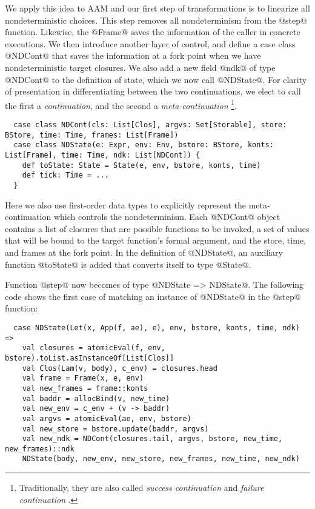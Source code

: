 \documentclass[acmsmall, review]{acmart}\settopmatter{}
\begin{document}
We apply this idea to AAM and our first step of transformations is to linearize all
nondeterministic choices. This step removes all nondeterminism from the @step@ function.
Likewise, the @Frame@ saves the information of the caller in concrete executions.
We then introduce another layer of control, and define a case class @NDCont@
that saves the information at a fork point when we have nondeterministic target closures.
We also add a new field @ndk@ of type @NDCont@ to the definition of state, which we now 
call @NDState@. For clarity of presentation in differentiating between the two continuations, 
we elect to call the first a \emph{continuation}, and the second a \emph{meta-continuation}
\footnote{Traditionally, they are also called \emph{success continuation} and \emph{failure
continuation} \cite{Danvy:1990:AC:91556.91622}.}.

\begin{lstlisting}
  case class NDCont(cls: List[Clos], argvs: Set[Storable], store: BStore, time: Time, frames: List[Frame])
  case class NDState(e: Expr, env: Env, bstore: BStore, konts: List[Frame], time: Time, ndk: List[NDCont]) {
    def toState: State = State(e, env, bstore, konts, time)
    def tick: Time = ...
  }
\end{lstlisting}

Here we also use first-order data types to explicitly represent the meta-continuation which
controls the nondeterminism.
Each @NDCont@ object contains a list of closures that are possible functions to be invoked,
a set of values that will be bound to the target function's formal argument, and the store, time,
and frames at the fork point. In the definition of @NDState@, an auxiliary function @toState@
is added that converts itself to type @State@.

Function @step@ now becomes of type @NDState => NDState@.
The following code shows the first case of matching an instance of @NDState@ in
the @step@ function:

\begin{lstlisting}
  case NDState(Let(x, App(f, ae), e), env, bstore, konts, time, ndk) =>
    val closures = atomicEval(f, env, bstore).toList.asInstanceOf[List[Clos]]
    val Clos(Lam(v, body), c_env) = closures.head
    val frame = Frame(x, e, env)
    val new_frames = frame::konts
    val baddr = allocBind(v, new_time)
    val new_env = c_env + (v -> baddr)
    val argvs = atomicEval(ae, env, bstore)
    val new_store = bstore.update(baddr, argvs)
    val new_ndk = NDCont(closures.tail, argvs, bstore, new_time, new_frames)::ndk
    NDState(body, new_env, new_store, new_frames, new_time, new_ndk)
\end{lstlisting}
\end{document}
